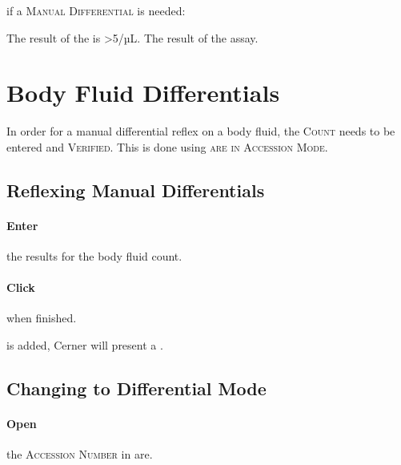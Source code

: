  if a \textsc{Manual Differential} is needed:

\begin{description}
     The result of the  is >5/µL.
     The result of the  assay.
\end{description}

\section{Body Fluid Differentials}

In order for a manual differential reflex on a body fluid, the \textsc{Count} needs to be entered and \textsc{Verified}. This is done using \textsc{\gls{are} in Accession Mode}.

\subsection{Reflexing Manual Differentials}

\paragraph{Enter} the results for the body fluid count.\\


\paragraph{Click}  when finished.

 is added, Cerner will present a .\\


\subsection{Changing to Differential Mode}

\paragraph{Open} the \textsc{Accession Number} in \gls{are}.\\

